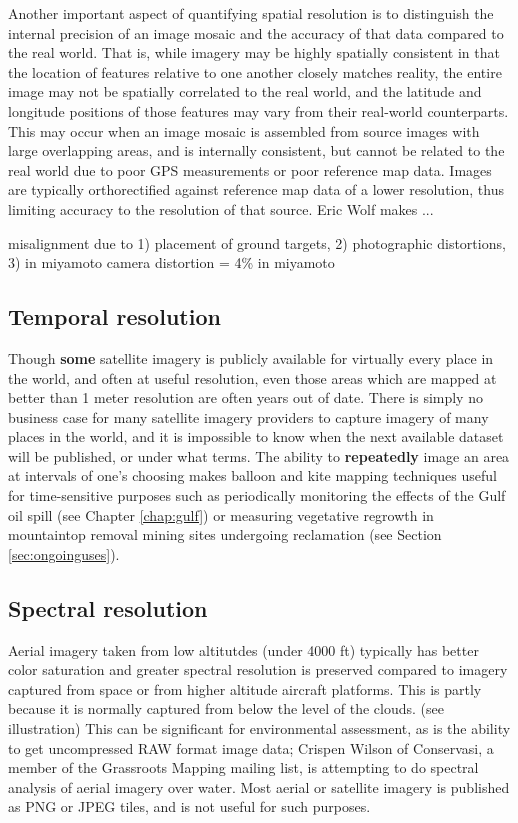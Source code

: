 \documentclass[11pt,oneside,notitlepage]{report}
\begin{document}
Another important aspect of quantifying spatial resolution is to distinguish the internal precision of an image mosaic and the accuracy of that data compared to the real world. That is, while imagery may be highly spatially consistent in that the location of features relative to one another closely matches reality, the entire image may not be spatially correlated to the real world, and the latitude and longitude positions of those features may vary from their real-world counterparts. This may occur when an image mosaic is assembled from source images with large overlapping areas, and is internally consistent, but cannot be related to the real world due to poor GPS measurements or poor reference map data. Images are typically orthorectified against reference map data of a lower resolution, thus limiting accuracy to the resolution of that source. Eric Wolf makes ...


misalignment due to 1) placement of ground targets, 2) photographic distortions, 3) in miyamoto
camera distortion = 4\% in miyamoto

\subsection{Temporal resolution}

Though \textbf{some} satellite imagery is publicly available for virtually every place in the world, and often at useful resolution, even those areas which are mapped at better than 1 meter resolution are often years out of date. There is simply no business case for many satellite imagery providers to capture imagery of many places in the world, and it is impossible to know when the next available dataset will be published, or under what terms. \cite{oconnor2008maps} The ability to \textbf{repeatedly} image an area at intervals of one's choosing makes balloon and kite mapping techniques useful for time-sensitive purposes such as periodically monitoring the effects of the Gulf oil spill (see Chapter \ref{chap:gulf}) or measuring vegetative regrowth in mountaintop removal mining sites undergoing reclamation (see Section \ref{sec:ongoinguses}). 

\subsection{Spectral resolution}

Aerial imagery taken from low altitutdes (under 4000 ft) typically has better color saturation and greater spectral resolution is preserved compared to imagery captured from space or from higher altitude aircraft platforms. This is partly because it is normally captured from below the level of the clouds. (see illustration) This can be significant for environmental assessment, as is the ability to get uncompressed RAW format image data; Crispen Wilson of Conservasi, a  member of the Grassroots Mapping mailing list, is attempting to do spectral analysis of aerial imagery over water. Most aerial or satellite imagery is published as PNG or JPEG tiles, and is not useful for such purposes.  
\end{document}
